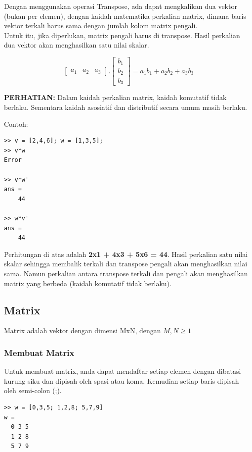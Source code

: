 \documentclass[12pt]{book}
\begin{document}
	Dengan menggunakan operasi Transpose, ada dapat mengkalikan dua vektor (bukan per elemen),
	dengan kaidah matematika perkalian matrix, dimana baris vektor terkali harus sama dengan jumlah kolom matrix pengali.
	\\
	Untuk itu, jika diperlukan, matrix pengali harus di transpose.
	Hasil perkalian dua vektor akan menghasilkan satu nilai skalar.
	
	\[
	\begin{bmatrix}
		a_1 & a_2 & a_3
	\end{bmatrix}
	.
	\begin{bmatrix}
		b_1 \\
		b_2 \\
		b_3
	\end{bmatrix}
	=
	a_{1}b_{1} + a_{2}b_{2} + a_{3}b_{3}  
	\]
	
	\textbf{PERHATIAN:} Dalam kaidah perkalian matrix, kaidah komutatif tidak berlaku.
	Sementara kaidah asosiatif dan distributif secara umum masih berlaku.
	
	Contoh:
	\begin{verbatim}
>> v = [2,4,6]; w = [1,3,5];
>> v*w
Error

>> v*w'
ans =
    44
    
>> w*v'
ans =
    44
	\end{verbatim}
	
	Perhitungan di atas adalah \textbf{2x1 + 4x3 + 5x6 = 44}.
	Hasil perkalian satu nilai skalar sehingga membalik terkali dan transpose pengali akan menghasilkan nilai sama.
	Namun perkalian antara transpose terkali dan pengali akan menghasilkan matrix yang berbeda (kaidah komutatif tidak berlaku).
	 
	\subsection{Matrix}
	
	Matrix adalah vektor dengan dimensi MxN, dengan $M,N \geq 1$ 
	
	\subsubsection{Membuat Matrix}
	
	Untuk membuat matrix, anda dapat mendaftar setiap elemen dengan dibatasi kurung siku dan dipisah oleh spasi atau koma.
	Kemudian setiap baris dipisah oleh semi-colon (;). 
	\begin{verbatim}
>> w = [0,3,5; 1,2,8; 5,7,9]
w = 
  0 3 5
  1 2 8
  5 7 9
	\end{verbatim}
\end{document}
